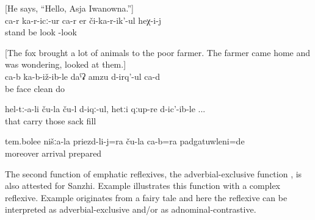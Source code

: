 \begin{exe}
	\ex	\label{ex:He says, Hello, Asja Iwanowna@3b} [He says, ``Hello, Asja Iwanowna.'']\\
	\gll	ca-r	ka-r-icː-ur	ca-r	er či-ka-r-ik'-ul	heχ-i-j\\
			stand	be	look -look	\\
	\glt	{}

	\ex	\label{ex:‎‎Itself (the fox itself) is sitting and cleaning its face@3d} [The fox brought a lot of animals to the poor farmer. The farmer came home and was wondering, looked at them.]\\
	\gll	ca-b	ka-b-iž-ib-le	daˁʡ	amzu	d-irq'-ul	ca-d\\
			be	face	clean	do	\\
	\glt	{}

	\ex	\label{ex:They themselves were carrying the sacks and when they were filled@15a}
	\gll	hel-tː-a-li	ču-la	ču-l	d-iqː-ul,	hetːi	qːup-re	d-ic'-ib-le ...\\
		that			carry	those	sack	fill\\
	\glt	{}

	\ex	\label{ex:Moreover, (the Icari people) themselves were prepared for our coming@15b}
	\gll	tem.bolee	nišːa-la	priezd-li-j=ra	ču-la	ca-b=ra	padgatuwleni=de\\
		moreover		arrival			prepared\\
	\glt	{}
\end{exe}
	
	
The second function of emphatic reflexives, the adverbial-exclusive function , is also attested for Sanzhi. Example  illustrates this function with a complex  reflexive. Example  originates from a fairy tale and here the reflexive can be interpreted as adverbial-exclusive and/or as adnominal-contrastive.

